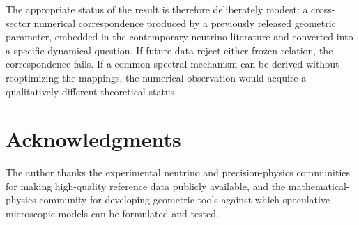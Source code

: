 \documentclass[10pt,twocolumn]{article}
\begin{document}
The appropriate status of the result is therefore deliberately modest: a
cross-sector numerical correspondence produced by a previously released geometric
parameter, embedded in the contemporary neutrino literature and converted into a
specific dynamical question.  If future data reject either frozen relation, the
correspondence fails.  If a common spectral mechanism can be derived without
reoptimizing the mappings, the numerical observation would acquire a qualitatively
different theoretical status.

\section*{Acknowledgments}

The author thanks the experimental neutrino and precision-physics communities for
making high-quality reference data publicly available, and the mathematical-physics
community for developing geometric tools against which speculative microscopic
models can be formulated and tested.
\end{document}
